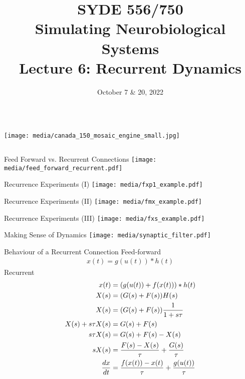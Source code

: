 \documentclass[handout,aspectratio=169]{beamer}
\date{October 7 \& 20, 2022}
\title{SYDE 556/750 \\ Simulating Neurobiological Systems \\ Lecture 6: Recurrent Dynamics}
\begin{document}
	
	\begin{frame}{}
		\vspace{0.5cm}
		\begin{columns}[c]
			\MakeTitle
			\texttt{[image: media/canada\_150\_mosaic\_engine\_small.jpg]}
		\end{columns}
	\end{frame}

	\begin{frame}{Feed Forward vs. Recurrent Connections}
		\centering
		\texttt{[image: media/feed\_forward\_recurrent.pdf]}
	\end{frame}

	\begin{frame}{Recurrence Experiments (I)}
		\centering
		\texttt{[image: media/fxp1\_example.pdf]}
	\end{frame}

	\begin{frame}{Recurrence Experiments (II)}
		\centering
		\texttt{[image: media/fmx\_example.pdf]}
	\end{frame}

	\begin{frame}{Recurrence Experiments (III)}
		\centering
		\texttt{[image: media/fxs\_example.pdf]}
	\end{frame}


	\begin{frame}{Making Sense of Dynamics}
		\centering
		\texttt{[image: media/synaptic\_filter.pdf]} 		
	\end{frame}


	\begin{frame}{Behaviour of a Recurrent Connection}
	Feed-forward
			\begin{align*}
				x(t) = g(u(t)) * h(t)				
			\end{align*}		
	Recurrent
			\begin{align*}
	x(t) &= (g(u(t)) + f(x(t))) * h(t)	\\
	X(s) &= (G(s) + F(s))H(s) \\
	X(s) &= (G(s) + F(s)){1 \over {1+s\tau}} \\
	X(s) + s\tau X(s) &= G(s) + F(s) \\
	s\tau X(s) &= G(s) + F(s) - X(s) \\
	sX(s) &= {{F(s) - X(s)} \over \tau} + {G(s) \over \tau} \\
	{dx \over dt} &= {{f(x(t))-x(t)} \over \tau} + {{g(u(t))} \over \tau}
			\end{align*}		
	
	\end{frame}
\end{document}
